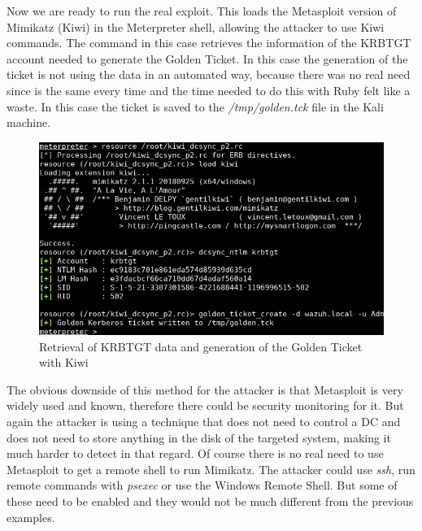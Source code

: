\linej
Now we are ready to run the real exploit. This loads the Metasploit version of Mimikatz (Kiwi) in the Meterpreter shell, allowing the attacker to use Kiwi commands.
The command in this case retrieves the information of the KRBTGT account needed to generate the Golden Ticket.
\linej
In this case the generation of the ticket is not using the data in an automated way, because there was no real need since is the same every time and the time needed to do this with Ruby felt like a waste. In this case the ticket is saved to the \textit{/tmp/golden.tck} file in the Kali machine.
\linej

\begin{figure}[H]
	\centering
	\includegraphics[width=\textwidth]{figuras/kiwi_p2.png}
	\caption{Retrieval of KRBTGT data and generation of the Golden Ticket with Kiwi}
\end{figure}
\linej
The obvious downside of this method for the attacker is that Metasploit is very widely used and known, therefore there could be security monitoring for it\cite{detect_metasploit_traffic}. But again the attacker is using a technique that does not need to control a DC and does not need to store anything in the disk of the targeted system, making it much harder to detect in that regard.
\linej
\linej
Of course there is no real need to use Metasploit to get a remote shell to run Mimikatz. The attacker could use \textit{ssh}, run remote commands with \textit{psexec} or use the Windows Remote Shell. But some of these need to be enabled and they would not be much different from the previous examples.

